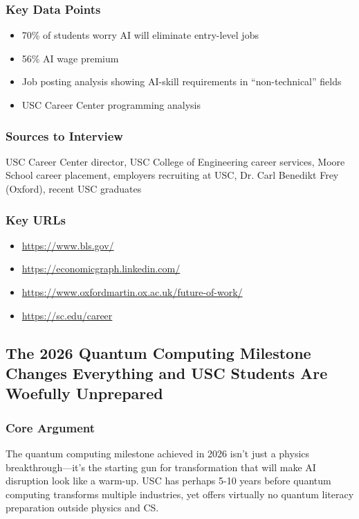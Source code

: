\documentclass[11pt,letterpaper]{article}
\begin{document}
\subsubsection*{Key Data Points}
\begin{itemize}[noitemsep]
    \item 70\% of students worry AI will eliminate entry-level jobs
    \item 56\% AI wage premium
    \item Job posting analysis showing AI-skill requirements in ``non-technical'' fields
    \item USC Career Center programming analysis
\end{itemize}

\subsubsection*{Sources to Interview}
USC Career Center director, USC College of Engineering career services, Moore School career placement, employers recruiting at USC, Dr. Carl Benedikt Frey (Oxford), recent USC graduates

\subsubsection*{Key URLs}
\begin{itemize}[noitemsep]
    \item \url{https://www.bls.gov/}
    \item \url{https://economicgraph.linkedin.com/}
    \item \url{https://www.oxfordmartin.ox.ac.uk/future-of-work/}
    \item \url{https://sc.edu/career}
\end{itemize}

\newpage
\subsection{The 2026 Quantum Computing Milestone Changes Everything and USC Students Are Woefully Unprepared}

\subsubsection*{Core Argument}
The quantum computing milestone achieved in 2026 isn't just a physics breakthrough---it's the starting gun for transformation that will make AI disruption look like a warm-up. USC has perhaps 5-10 years before quantum computing transforms multiple industries, yet offers virtually no quantum literacy preparation outside physics and CS.
\end{document}
